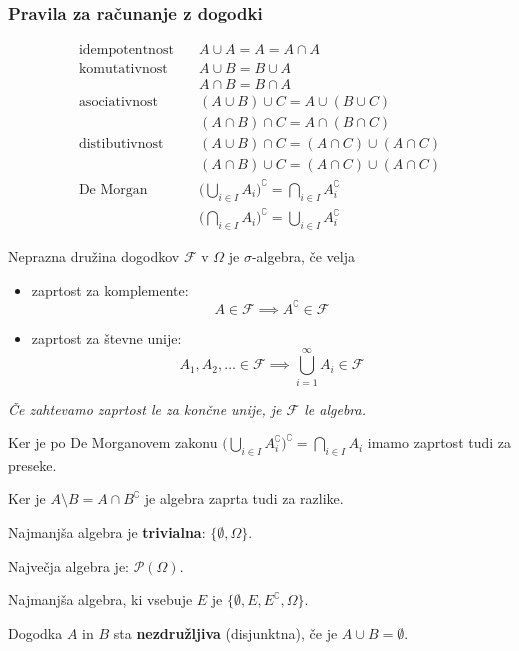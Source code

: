 \begin{multicols}{4}
\subsubsection{Pravila za računanje z dogodki}
\begin{align*}
	\text{idempotentnost} & \quad A \cup A = A = A \cap A \\
	\text{komutativnost} & \quad A \cup B = B \cup A \\
	& \quad A \cap B = B \cap A \\
	\text{asociativnost} & \quad (A \cup B) \cup C = A \cup ( B \cup C) \\
	& \quad (A \cap B) \cap C = A \cap ( B \cap C) \\
	\text{distibutivnost} & \quad (A \cup B) \cap C = (A \cap C) \cup ( A \cap C) \\
	& \quad (A \cap B) \cup C = (A \cap C) \cup ( A \cap C) \\
	\text{De Morgan} & \quad \big(\bigcup_{i\in I} A_i \big)^\complement = \bigcap_{i \in I} A_i^\complement  \\
	& \quad \big(\bigcap_{i\in I} A_i \big)^\complement = \bigcup_{i \in I} A_i^\complement
\end{align*}

Neprazna družina dogodkov $\mathcal{F}$ v $\Omega$ je $\sigma$-algebra, če velja
\begin{itemize}
	\item zaprtost za komplemente: \[ A \in \mathcal{F} \implies A^\complement \in \mathcal{F} \]
	\item zaprtost za števne unije: \[ A_1, A_2, \dots \in \mathcal{F} \implies \bigcup_{i=1}^\infty A_i \in \mathcal{F} \]
\end{itemize}
\textit{Če zahtevamo zaprtost le za končne unije, je $\mathcal{F}$ le algebra.}

Ker je po De Morganovem zakonu $\big(\bigcup_{i\in I} A_i^\complement \big)^\complement = \bigcap_{i \in I} A_i$ imamo zaprtost tudi za preseke.

Ker je $A \setminus B = A \cap B^\complement$ je algebra zaprta tudi za razlike.

Najmanjša algebra je \textbf{trivialna}: $ \{ \emptyset, \Omega \}$.

Največja algebra je: $\mathcal{P}(\Omega)$.

Najmanjša algebra, ki vsebuje $E$ je $\{ \emptyset, E, E^\complement, \Omega \}$.

Dogodka $A$ in $B$ sta \textbf{nezdružljiva} (disjunktna), če je $A \cup B = \emptyset$.


\end{multicols}
